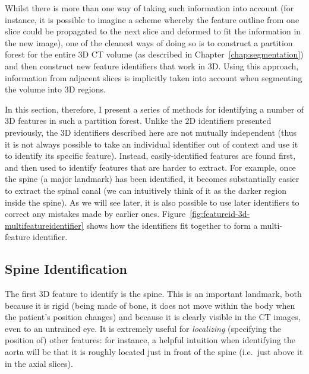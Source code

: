 
Whilst there is more than one way of taking such information into account (for instance, it is possible to imagine a scheme whereby the feature outline from one slice could be propagated to the next slice and deformed to fit the information in the new image), one of the cleanest ways of doing so is to construct a partition forest for the entire 3D CT volume (as described in Chapter~\ref{chap:segmentation}) and then construct new feature identifiers that work in 3D. Using this approach, information from adjacent slices is implicitly taken into account when segmenting the volume into 3D regions.

In this section, therefore, I present a series of methods for identifying a number of 3D features in such a partition forest. Unlike the 2D identifiers presented previously, the 3D identifiers described here are not mutually independent (thus it is not always possible to take an individual identifier out of context and use it to identify its specific feature). Instead, easily-identified features are found first, and then used to identify features that are harder to extract. For example, once the spine (a major landmark) has been identified, it becomes substantially easier to extract the spinal canal (we can intuitively think of it as the darker region inside the spine). As we will see later, it is also possible to use later identifiers to correct any mistakes made by earlier ones. Figure~\ref{fig:featureid-3d-multifeatureidentifier} shows how the identifiers fit together to form a multi-feature identifier.

\subsection{Spine Identification}

The first 3D feature to identify is the spine. This is an important landmark, both because it is rigid (being made of bone, it does not move within the body when the patient's position changes) and because it is clearly visible in the CT images, even to an untrained eye. It is extremely useful for \emph{localizing} (specifying the position of) other features: for instance, a helpful intuition when identifying the aorta will be that it is roughly located just in front of the spine (i.e.~just above it in the axial slices).

